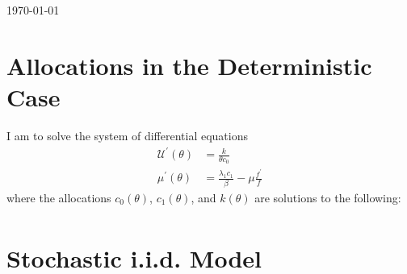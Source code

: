 \documentclass[11pt]{article}
\newcommand{\p}{\prime}
\newcommand{\U}{\mathcal{U}}
\begin{document}
\today

\section{Allocations in the Deterministic Case}

I am to solve the system of differential equations 
\begin{align}
    \U^\p(\theta) &= \frac{k}{\theta c_0} \\
    \mu^\p(\theta) &= \frac{\lambda_1 c_1}{\beta} - \mu \frac{f^\p}{f}
\end{align}
where the allocations \( c_0(\theta) \), \( c_1(\theta) \), and \( k(\theta) \) are solutions to the following:
\begin{align}
    
\end{align}

\section{Stochastic i.i.d. Model }
\end{document}
